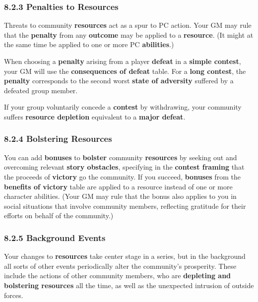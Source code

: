\documentclass[
]{article}
\begin{document}
\hypertarget{penalties-to-resources}{%
\subsubsection{8.2.3 Penalties to
Resources}\label{penalties-to-resources}}

Threats to community \textbf{resources} act as a spur to PC action. Your
GM may rule that the \textbf{penalty} from any \textbf{outcome} may be
applied to a \textbf{resource}. (It might at the same time be applied to
one or more PC \textbf{abilities}.)

When choosing a \textbf{penalty} arising from a player \textbf{defeat}
in a \textbf{simple contest}, your GM will use the \textbf{consequences
of defeat} table. For a \textbf{long contest}, the \textbf{penalty}
corresponds to the second worst \textbf{state of adversity} suffered by
a defeated group member.

If your group voluntarily concede a \textbf{contest} by withdrawing,
your community suffers \textbf{resource depletion} equivalent to a
\textbf{major defeat}.

\hypertarget{bolstering-resources}{%
\subsubsection{8.2.4 Bolstering Resources}\label{bolstering-resources}}

You can add \textbf{bonuses} to \textbf{bolster} community
\textbf{resources} by seeking out and overcoming relevant \textbf{story
obstacles}, specifying in the \textbf{contest framing} that the proceeds
of \textbf{victory} go the community. If you succeed, \textbf{bonuses}
from the \textbf{benefits of victory} table are applied to a resource
instead of one or more character abilities. (Your GM may rule that the
bonus also applies to you in social situations that involve community
members, reflecting gratitude for their efforts on behalf of the
community.)

\hypertarget{background-events}{%
\subsubsection{8.2.5 Background Events}\label{background-events}}

Your changes to \textbf{resources} take center stage in a series, but in
the background all sorts of other events periodically alter the
community's prosperity. These include the actions of other community
members, who are \textbf{depleting and bolstering resources} all the
time, as well as the unexpected intrusion of outside forces.
\end{document}
